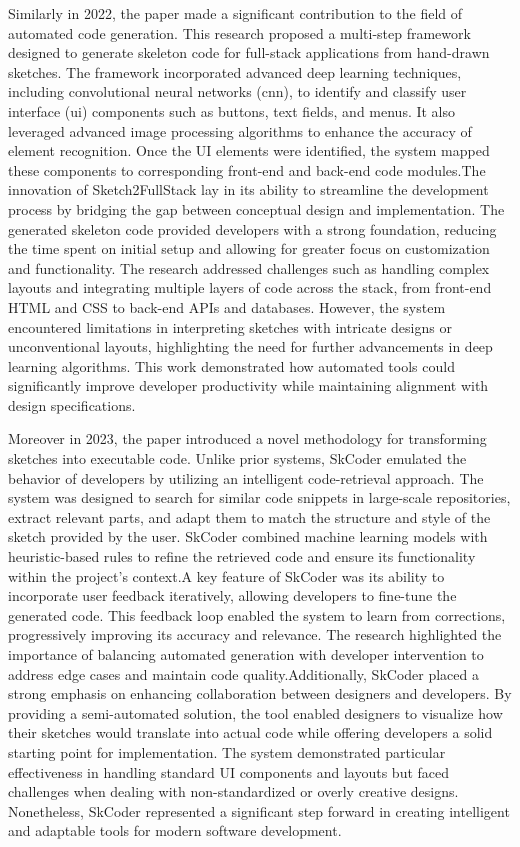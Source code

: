 Similarly in 2022, the paper \cite{2211.14607} made a significant contribution to the field of automated code generation. This research proposed a multi-step framework designed to generate skeleton code for full-stack applications from hand-drawn sketches. The framework incorporated advanced deep learning techniques, including convolutional neural networks (\gls{cnn}), to identify and classify user interface (\gls{ui}) components such as buttons, text fields, and menus. It also leveraged advanced image processing algorithms to enhance the accuracy of element recognition. Once the UI elements were identified, the system mapped these components to corresponding front-end and back-end code modules.The innovation of Sketch2FullStack lay in its ability to streamline the development process by bridging the gap between conceptual design and implementation. The generated skeleton code provided developers with a strong foundation, reducing the time spent on initial setup and allowing for greater focus on customization and functionality. The research addressed challenges such as handling complex layouts and integrating multiple layers of code across the stack, from front-end HTML and CSS to back-end APIs and databases. However, the system encountered limitations in interpreting sketches with intricate designs or unconventional layouts, highlighting the need for further advancements in deep learning algorithms. This work demonstrated how automated tools could significantly improve developer productivity while maintaining alignment with design specifications.

Moreover in 2023, the paper \cite{2302.06144} introduced a novel methodology for transforming sketches into executable code. Unlike prior systems, SkCoder emulated the behavior of developers by utilizing an intelligent code-retrieval approach. The system was designed to search for similar code snippets in large-scale repositories, extract relevant parts, and adapt them to match the structure and style of the sketch provided by the user. SkCoder combined machine learning models with heuristic-based rules to refine the retrieved code and ensure its functionality within the project's context.A key feature of SkCoder was its ability to incorporate user feedback iteratively, allowing developers to fine-tune the generated code. This feedback loop enabled the system to learn from corrections, progressively improving its accuracy and relevance. The research highlighted the importance of balancing automated generation with developer intervention to address edge cases and maintain code quality.Additionally, SkCoder placed a strong emphasis on enhancing collaboration between designers and developers. By providing a semi-automated solution, the tool enabled designers to visualize how their sketches would translate into actual code while offering developers a solid starting point for implementation. The system demonstrated particular effectiveness in handling standard UI components and layouts but faced challenges when dealing with non-standardized or overly creative designs. Nonetheless, SkCoder represented a significant step forward in creating intelligent and adaptable tools for modern software development.

